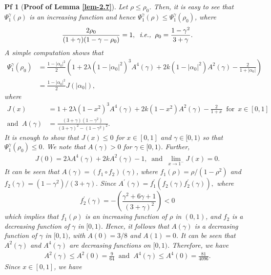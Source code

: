 \documentclass[10pt,a4paper]{amsart}
\newtheorem{pf}{Pf}
\begin{document}
\begin{pf}[\bf Proof of Lemma \ref{lem-2.7}]
	Let $ \rho\leq \rho_0 $. Then, it is easy to see that $\Psi_1^{\gamma}(\rho)$ is an increasing function and hence $ 	\Psi_1^{\gamma}(\rho)\leq 	\Psi_1^{\gamma}(\rho_0) $, where 
	\begin{align*}
		\frac{2\rho_0}{(1+\gamma)(1-\gamma-\rho_0)}=1,\;\;\text{\it i.e.,}\;\; \rho_0=\frac{1-\gamma^2}{3+\gamma}.
	\end{align*}
	A simple computation shows that 
	\begin{align*}
		\Psi_1^{\gamma}(\rho_0)&=\frac{1-|\alpha_0|^2}{2}\left(1+2\lambda(1-|\alpha_0|^2)^3A^4(\gamma)+2k(1-|\alpha_0|^2)A^2(\gamma)-\frac{2}{1+|\alpha_0|}\right)\\&=\frac{1-|\alpha_0|^2}{2}J(|\alpha_0|),
	\end{align*}
	where 
	\begin{align*}
		J(x)&=1+2\lambda(1-x^2)^3A^4(\gamma)+2k(1-x^2)A^2(\gamma)-\frac{2}{1+x}\;\; \mbox{for}\;\ x\in [0,1]\\\text{and}\;\; A(\gamma)&=\frac{(3+\gamma)(1-\gamma^2)}{(3+\gamma)^2-(1-\gamma^2)^2}.
	\end{align*}
	It is enough to show that $ J(x)\leq 0 $ for $ x\in [0,1] $ and $ \gamma\in [0,1) $ so that $ 	\Psi_1^{\gamma}(\rho_0)\leq 0 $. We note that $ A(\gamma)>0 $ for $ \gamma\in [0,1) $. Further,
	\begin{align*}
		J(0)=2\lambda A^4(\gamma)+2kA^2(\gamma)-1, \;\; \text{and}\;\; \lim_{x\rightarrow 1^{-}}J(x)=0.
	\end{align*}
	It can be seen that $ A(\gamma)=(f_1\circ f_2)(\gamma) $, where $ f_1(\rho)=\rho/(1-\rho^2) $ and $ f_2(\gamma)=(1-\gamma^2)/(3+\gamma). $
	Since $ A^{\prime}(\gamma)=f^{\prime}_1(f_2(\gamma)f^{\prime}_2(\gamma)), $ where 
	\begin{equation}
		f^{\prime}_2(\gamma)=-\left(\frac{\gamma^2+6\gamma+1}{(3+\gamma)^2}\right)<0
	\end{equation}
	which implies that $ f_1(\rho) $ is an increasing function of $ \rho $ in $ (0,1) $, and $ f_2 $ is a decreasing function of $ \gamma $ in $ [0,1) $. Hence, it follows that $ A(\gamma) $ is a decreasing function of $ \gamma $  in $ [0,1) $, with $ A(0)=3/8 $ and $ A(1)=0 $. It can be seen that $ A^2(\gamma) $ and $ A^4(\gamma) $ are decreasing functions on $ [0,1) $. Therefore, we have 
	\begin{align*}
		A^2(\gamma)\leq A^2(0)=\frac{9}{64}\;\; \text{and}\;\; A^4(\gamma)\leq A^4(0)=\frac{81}{4096}.
	\end{align*}
	Since $ x\in [0,1] $, we have
	\begin{align*}

\end{align*}
\end{pf}
\end{document}

